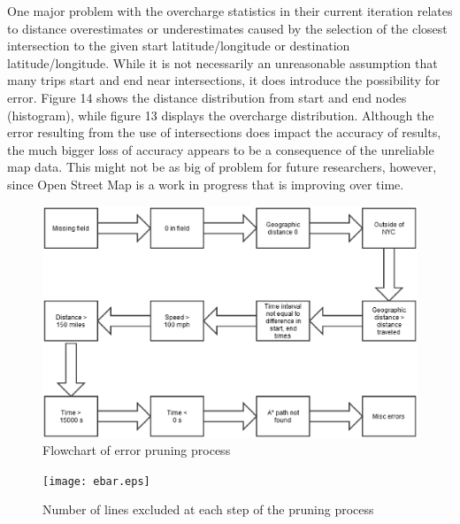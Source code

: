 \documentclass{sig-alternate}
\begin{document}
One major problem with the overcharge statistics in their current iteration relates to distance overestimates or underestimates caused by the selection of the closest intersection to the given start latitude/longitude or destination latitude/longitude. While it is not necessarily an unreasonable assumption that many trips start and end near intersections, it does introduce the possibility for error. Figure 14 shows the distance distribution from start and end nodes (histogram), while figure 13 displays the overcharge distribution. Although the error resulting from the use of intersections does impact the accuracy of results, the much bigger loss of accuracy appears to be a consequence of the unreliable map data. This might not be as big of problem for future researchers, however, since Open Street Map is a work in progress that is improving over time.

\begin{figure}
\includegraphics[scale=.25]{flow2.eps}
\caption{Flowchart of error pruning process}
\end{figure}

\begin{figure}
\texttt{[image: ebar.eps]}
\caption{Number of lines excluded at each step of the pruning process}
\end{figure}
\end{document}

